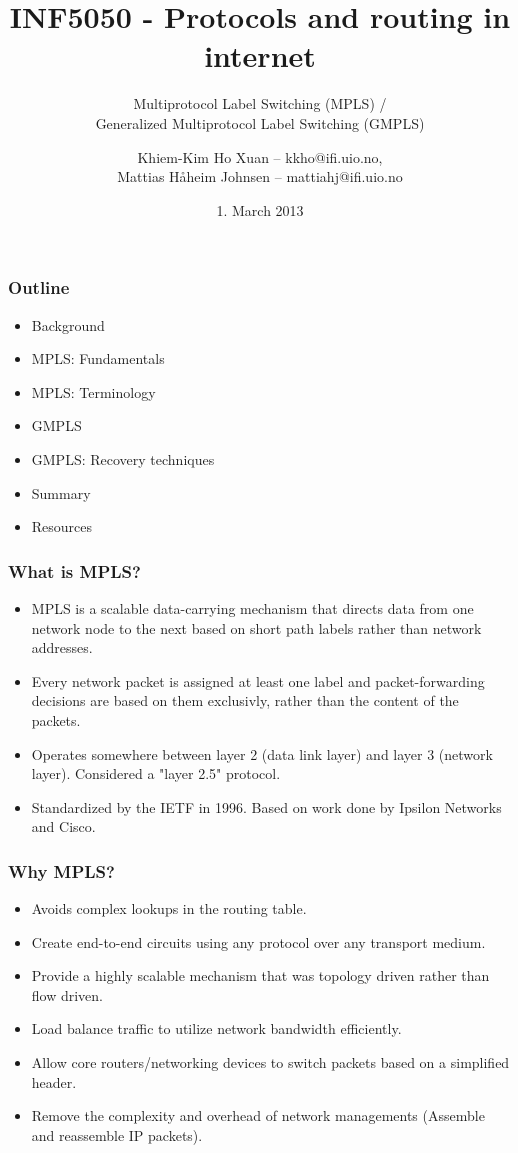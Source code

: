 \documentclass[12pt]{beamer}
\title[]{INF5050 - Protocols and routing in internet}
\subtitle[]{Multiprotocol Label Switching (MPLS) / \\
			Generalized Multiprotocol Label Switching (GMPLS) }
\author{Khiem-Kim Ho Xuan -- kkho@ifi.uio.no, \\
		Mattias H{\aa}heim Johnsen -- mattiahj@ifi.uio.no}
\date{1. March 2013}
\begin{document}
\begin{frame}
  \titlepage
\end{frame}

\begin{frame}
  \frametitle{Outline}
  \begin{itemize}
  \item Background
  \item MPLS: Fundamentals
  \item MPLS: Terminology
  \item GMPLS
  \item GMPLS: Recovery techniques
  \item Summary
  \item Resources
  
  \end{itemize}
\end{frame}

\begin{frame}
  \frametitle{What is MPLS?}
	\begin{itemize}
	    \item MPLS is a scalable data-carrying mechanism that directs data from one network node to the next based on short path labels rather than network addresses.
        \item Every network packet is assigned at least one label and packet-forwarding decisions are based on them exclusivly, rather than the content of the packets.
        \item Operates somewhere between layer 2 (data link layer) and layer 3 (network layer). Considered a "layer 2.5" protocol.
        \item Standardized by the IETF in 1996. Based on work done by Ipsilon Networks and Cisco.
	\end{itemize}
\end{frame}

\begin{frame}
  \frametitle{Why MPLS?}
	\begin{itemize}
        \item Avoids complex lookups in the routing table.
        \item Create end-to-end circuits using any protocol over any transport medium.
		\item Provide a highly scalable mechanism that was topology driven rather than flow driven.
		\item Load balance traffic to utilize network bandwidth efficiently.
		\item Allow core routers/networking devices to switch packets based on a simplified header.
		\item Remove the complexity and overhead of network managements (Assemble and reassemble IP packets).		
	\end{itemize}
\end{frame}
\end{document}
